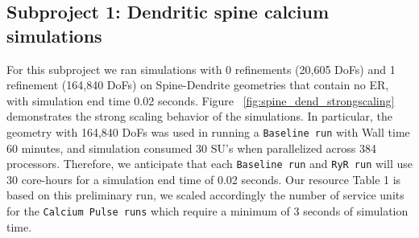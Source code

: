 \subsection*{Subproject 1: Dendritic spine calcium simulations}
For this subproject we ran simulations with 0 refinements (20,605 DoFs) and 1 refinement (164,840 DoFs) on Spine-Dendrite geometries that contain no ER, with simulation end time 0.02 seconds. Figure ~\ref{fig:spine_dend_strongscaling} demonstrates the strong scaling behavior of the simulations. In particular, the geometry with 164,840 DoFs was used in running a \texttt{Baseline run} with Wall time 60 minutes, and simulation consumed 30 SU's when parallelized across 384 processors. Therefore, we anticipate that each \texttt{Baseline run} and \texttt{RyR run} will use 30 core-hours for a simulation end time of 0.02 seconds. Our resource Table 1 is based on this preliminary run, we scaled accordingly the number of service units for the \texttt{Calcium Pulse runs} which require a minimum of 3 seconds of simulation time.
